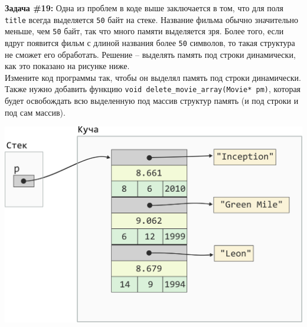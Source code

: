 \documentclass{article}
\begin{document}
\vspace{65ex}
\textbf{Задача \#19:} Одна из проблем в коде выше заключается в том, что для поля \texttt{title} всегда
выделяется \texttt{50} байт на стеке. Название фильма обычно значительно меньше, чем \texttt{50} байт, так что 
много памяти выделяется зря. Более того, если вдруг появится фильм с длиной названия более \texttt{50} символов, то такая структура не сможет его обработать. Решение -- выделять память под строки динамически, как это
показано на рисунке ниже. \\
Измените код программы так, чтобы он выделял память под строки 
динамически. Также нужно добавить функцию \texttt{void delete\_movie\_array(Movie* pm)}, которая будет
освобождать всю выделенную под массив структур память (и под строки и под сам массив).


\begin{center}
\includegraphics[scale=0.9]{../images/pointer_schemes/pointer_to_array_of_struct_movie_charpointers.png}
\end{center}
\end{document}
